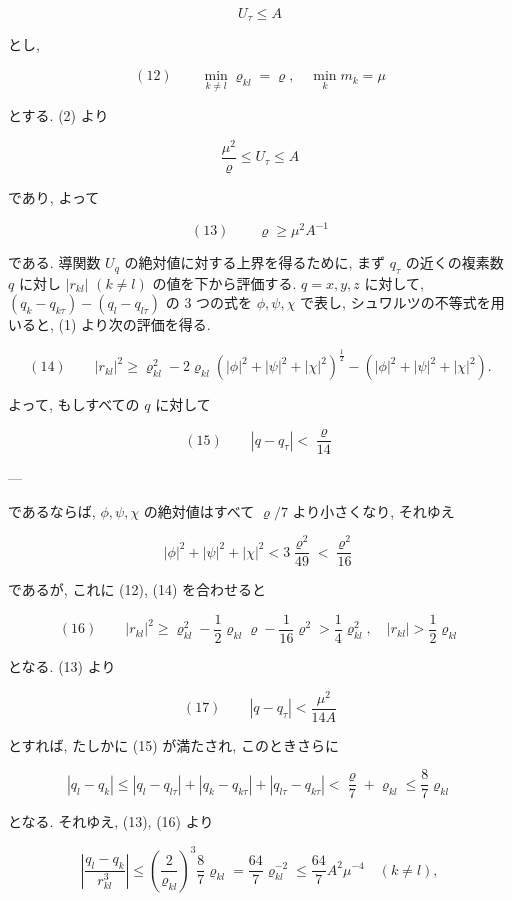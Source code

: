 \documentclass[dvipdfmx, leqno]{jsbook}
\begin{document}
$$U_\tau \leq A$$

とし,

$$(12) \qquad \min_{k \neq l} \varrho_{kl} = \varrho, \quad \min_{k} m_k = \mu$$

とする. (2) より

$$\frac{\mu^2}{\varrho} \leq U_\tau \leq A$$

であり, よって

$$(13) \qquad \varrho \geq \mu^2 A^{-1}$$

である. 導関数 $U_q$ の絶対値に対する上界を得るために, まず $q_\tau$ の近くの複素数 $q$ に対し $|r_{kl}|$ $(k \neq l)$ の値を下から評価する. $q = x, y, z$ に対して, $(q_k - q_{k\tau}) - (q_l - q_{l\tau})$ の 3 つの式を $\phi, \psi, \chi$ で表し, シュワルツの不等式を用いると, (1) より次の評価を得る.

$$(14) \qquad |r_{kl}|^2 \geq \varrho_{kl}^2 - 2\varrho_{kl} (|\phi|^2 + |\psi|^2 + |\chi|^2)^{\frac{1}{2}} - (|\phi|^2 + |\psi|^2 + |\chi|^2).$$

よって, もしすべての $q$ に対して

$$(15) \qquad |q - q_\tau| < \frac{\varrho}{14}$$

---


であるならば, $\phi, \psi, \chi$ の絶対値はすべて $\varrho / 7$ より小さくなり, それゆえ

$$|\phi|^2 + |\psi|^2 + |\chi|^2 < 3 \frac{\varrho^2}{49} < \frac{\varrho^2}{16}$$

であるが, これに (12), (14) を合わせると

$$(16) \qquad |r_{kl}|^2 \geq \varrho_{kl}^2 - \frac{1}{2} \varrho_{kl} \varrho - \frac{1}{16} \varrho^2 > \frac{1}{4} \varrho_{kl}^2, \quad |r_{kl}| > \frac{1}{2} \varrho_{kl}$$

となる. (13) より

$$(17) \qquad |q - q_\tau| < \frac{\mu^2}{14A}$$

とすれば, たしかに (15) が満たされ, このときさらに

$$|q_l - q_k| \leq |q_l - q_{l\tau}| + |q_k - q_{k\tau}| + |q_{l\tau} - q_{k\tau}| < \frac{\varrho}{7} + \varrho_{kl} \leq \frac{8}{7} \varrho_{kl}$$

となる. それゆえ, (13), (16) より

$$\left| \frac{q_l - q_k}{r_{kl}^3} \right| \leq \left(\frac{2}{\varrho_{kl}}\right)^3 \frac{8}{7} \varrho_{kl} = \frac{64}{7} \varrho_{kl}^{-2} \leq \frac{64}{7} A^2 \mu^{-4} \quad (k \neq l),$$
\end{document}
